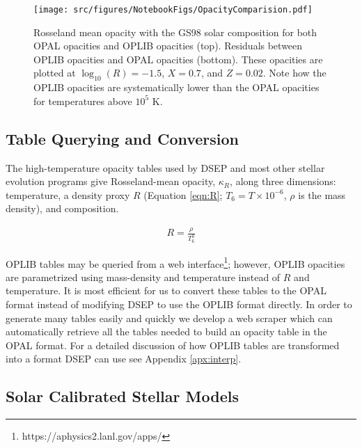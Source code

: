 \begin{figure}
	\centering
	\texttt{[image: src/figures/NotebookFigs/OpacityComparision.pdf]}
	\caption{Rosseland mean opacity with the GS98 solar composition for both
	OPAL opacities and OPLIB opacities (top). Residuals between OPLIB opacities
	and OPAL opacities (bottom). These opacities are plotted at $\log _{10}(R)
	= -1.5$, $X=0.7$, and $Z=0.02$. Note how the OPLIB opacities are
	systematically lower than the OPAL opacities for temperatures above $10^5$
	K.}
	\label{fig:opacComp}
\end{figure}

\subsection{Table Querying and Conversion}
The high-temperature opacity tables used by DSEP and most other stellar
evolution programs give Rosseland-mean opacity, $\kappa_{R}$, along three
dimensions: temperature, a density proxy $R$ (Equation \ref{eqn:R}; $T_{6} =
T\times10^{-6}$, $\rho$ is the mass density), and composition. 

\begin{align} \label{eqn:R}
	R = \frac{\rho}{T_{6}^{3}}
\end{align}

OPLIB tables may be queried from a web
interface\footnote{https://aphysics2.lanl.gov/apps/}; however, OPLIB opacities
are parametrized using mass-density and temperature instead of $R$ and
temperature. It is most efficient for us to convert these tables to the OPAL
format instead of modifying DSEP to use the OPLIB format directly. In order to
generate many tables easily and quickly we develop a web scraper which can
automatically retrieve all the tables needed to build an opacity table in the
OPAL format. For a detailed discussion of how OPLIB tables are transformed into
a format DSEP can use see Appendix \ref{apx:interp}.

\subsection{Solar Calibrated Stellar Models}\label{sec:SCSM}


